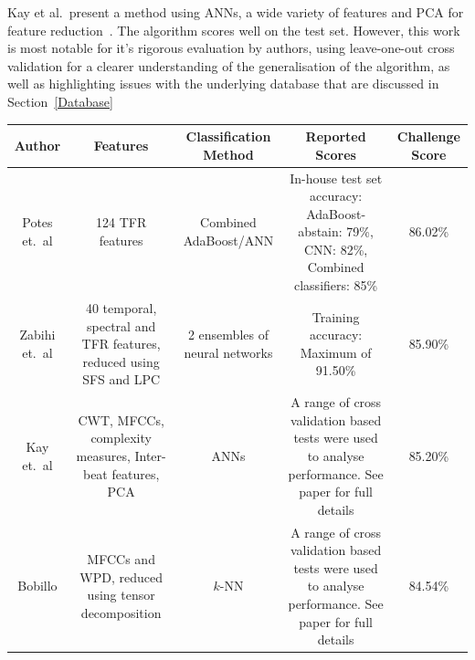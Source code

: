 \documentclass[titlepage, 12pt]{scrartcl} \usepackage{enumitem}
\newcommand{\dtoprule}{\specialrule{1pt}{0pt}{1.4pt}%
            \specialrule{1pt}{0pt}{\belowrulesep}%
            }
\begin{document}
Kay et al.\ present a method using ANNs, a wide variety of features and PCA for
feature reduction~\parencite{Kay2017}. The algorithm scores well on the test
set. However, this work is most notable for it's rigorous evaluation by
authors, using leave-one-out cross validation for a clearer understanding of
the generalisation of the algorithm, as well as highlighting issues with the
underlying database that are discussed in Section~\ref{Database}


\begin{landscape}
\begin{table}[H]
    \label{PhysionetTable}
\scriptsize
{}
\doublespacing
\begin{tabulary}{\linewidth}{CCCCC}
\dtoprule
Author                                           & Features                                                                        & Classification Method                                    & Reported Scores                                                                                      & Challenge Score \\ \midrule
Potes et.~al \citeyearpar{Potes2016}             & 124 TFR features                                                                & Combined AdaBoost/ANN                                    & In-house test set accuracy: AdaBoost-abstain: 79\%, CNN: 82\%, Combined classifiers: 85\%            & 86.02\%         \\
Zabihi et.~al \citeyearpar{Zabihi2016}           & 40 temporal, spectral and TFR features, reduced using SFS and LPC               & 2 ensembles of neural networks                           & Training accuracy: Maximum of 91.50\%                                                                & 85.90\%         \\
Kay et.~al \citeyearpar{Kay2017}                 & CWT, MFCCs, complexity measures, Inter-beat features, PCA                       & ANNs                                                     & A range of cross validation based tests were used to analyse performance. See paper for full details & 85.20\%         \\
Bobillo \citeyearpar{Bobillo2016}                & MFCCs and WPD, reduced using tensor decomposition                               & $k$-NN                                                   & A range of cross validation based tests were used to analyse performance. See paper for full details & 84.54\%         \\

\end{tabulary}
\end{table}
\end{landscape}
\end{document}
